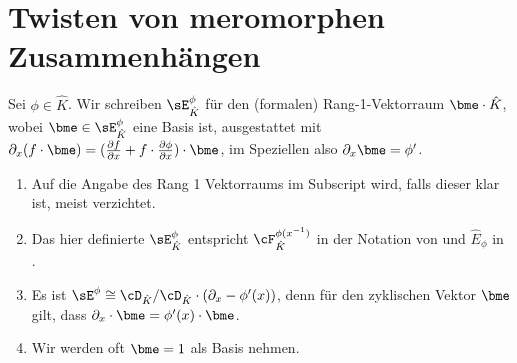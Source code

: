 \section{Twisten von meromorphen Zusammenhängen}
\begin{defn} \label{defn:rang1Vr}
Sei $\phi\in\hat K$.
Wir schreiben $\sE_{\hat K}^\phi$ für den (formalen) Rang-1-Vektorraum 
$\bme\cdot\hat K$, wobei $\bme\in\sE_{\hat K}^\phi$ eine Basis ist,
ausgestattet mit $\partial_x(f\cdot \bme) =(\frac{\partial f}{\partial
x}+f\cdot\frac{\partial\phi}{\partial x})\cdot\bme$, im Speziellen also
$\partial_x\bme=\phi'$.
\begin{comment}
nach \cite[1.a]{sabbah_Fourier-local}
\end{comment}
\end{defn}
\begin{bem}
\begin{enumerate}
\item Auf die Angabe des Rang 1 Vektorraums im Subscript wird, falls dieser
klar ist, meist verzichtet.
\item Das hier definierte $\sE^{\phi}_{\hat K}$ entspricht
$\cF^{\phi(x^{-1})}_{\hat K}$ in der Notation von
\cite[5.4.4]{sabbah_cimpa90} und $\hat E_\phi$ in \cite[Def 5.8]{DiplHedwig}.
\item Es ist $\sE^\phi\cong\cD_{\hat K}/\cD_{\hat
K}\cdot(\partial_x-\phi'(x))$, denn für den zyklischen Vektor $\bme$ gilt, dass
$\partial_x \cdot \bme = \phi'(x) \cdot \bme$.
\item Wir werden oft $\bme=1$ als Basis nehmen.
\end{enumerate}
\end{bem}

